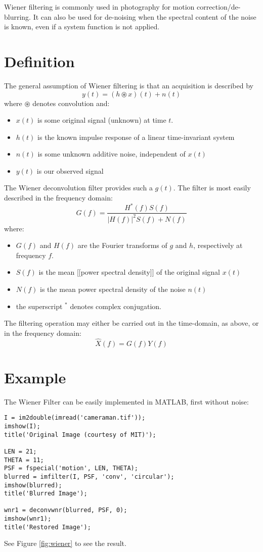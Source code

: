 Wiener filtering is commonly used in photography for motion correction/de-blurring. It can also be used for de-noising when the spectral content of the noise is known, even if a system function is not applied.
\section{Definition}
The general assumption of Wiener filtering is that an acquisition is described by
\begin{equation}
 y(t) = (h\circledast x)(t) + n(t)
\end{equation}
where $\circledast$ denotes convolution and:
\begin{itemize}
	\item $ x(t)$ is some original signal (unknown) at time $ t $.
	\item $ h(t)$ is the known impulse response of a linear time-invariant system
	\item $ n(t)$ is some unknown additive noise, independent of $ x(t)$
	\item $ y(t)$ is our observed signal
\end{itemize}
The Wiener deconvolution filter provides such a $ g(t)$.  The filter is most easily described in the frequency domain:
\begin{equation}
G(f) = \frac{H^*(f)S(f)}{ |H(f)|^2 S(f) + N(f) }
\end{equation}
where:
\begin{itemize}
\item $ G(f)$ and $ H(f)$ are the Fourier transforms of $ g$ and $ h$, respectively at frequency $ f $.
\item $ S(f)$ is the mean [[power spectral density]] of the original signal $ x(t)$
\item $ N(f)$ is the mean power spectral density of the noise $ n(t)$
\item the superscript ${}^*$ denotes complex conjugation.
\end{itemize}
The filtering operation may either be carried out in the time-domain, as above, or in the frequency domain:
\begin{equation}
\hat{X}(f) = G(f)Y(f)
\end{equation}

\section{Example}
The Wiener Filter can be easily implemented in MATLAB, first without noise:
\begin{lstlisting}
I = im2double(imread('cameraman.tif'));
imshow(I);
title('Original Image (courtesy of MIT)');

LEN = 21;
THETA = 11;
PSF = fspecial('motion', LEN, THETA);
blurred = imfilter(I, PSF, 'conv', 'circular');
imshow(blurred);
title('Blurred Image');

wnr1 = deconvwnr(blurred, PSF, 0);
imshow(wnr1);
title('Restored Image');
\end{lstlisting}
See Figure \ref{fig:wiener} to see the result.

